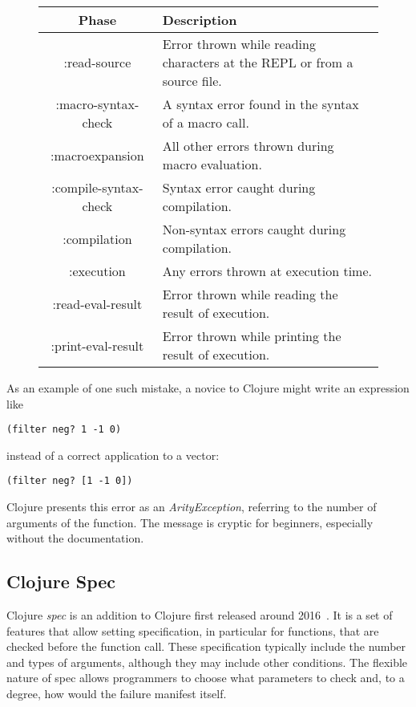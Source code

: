 \documentclass[12pt]{article}
\newcommand{\comment}[1]{{\bf \tt  {#1}}}
\newcommand{\emcomment}[1]{\textcolor{ForestGreen}{\comment{Elena: {#1}}}}
\begin{document}
	\begin{figure}[h]
		\centering
		\begin{tabular}{|c|l|}
			\hline
			\textbf{Phase} & \textbf{Description} \\
			\hline
			:read-source & Error thrown while reading characters at the REPL or from a source file. \\
			:macro-syntax-check & A syntax error found in the syntax of a macro call. \\
			:macroexpansion & All other errors thrown during macro evaluation. \\
			:compile-syntax-check & Syntax error caught during compilation. \\
			:compilation & Non-syntax errors caught during compilation. \\
			:execution & Any errors thrown at execution time. \\
			:read-eval-result & Error thrown while reading the result of execution. \\
			:print-eval-result & Error thrown while printing the result of execution. \\
			\hline
		\end{tabular}
	\end{figure}
	

As an example of one such mistake, a novice to Clojure might write an expression like
\begin{verbatim}
(filter neg? 1 -1 0)
\end{verbatim}
instead of a correct application to a vector:
\begin{verbatim}
(filter neg? [1 -1 0])
\end{verbatim}
 Clojure presents this error as an {\it ArityException}, referring to the number of arguments of the function. 
 The message is cryptic for beginners, especially without the documentation.

\subsection{Clojure Spec}\label{subsec:spec}
Clojure \textit{spec} is an addition to Clojure first released around 2016~\cite{spec-overview}.
It is a set of features that allow setting specification, in particular for functions, that are checked before the function call. 
These specification typically include the number and types of arguments, although they may include other conditions.
The flexible nature of spec allows programmers to choose what parameters to check and, to a degree, how would the failure manifest itself. 
\end{document}
